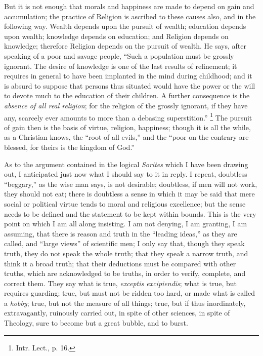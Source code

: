 But it is not enough that morals and happiness are made to depend
on gain and accumulation; the practice of Religion is ascribed to
these causes also, and in the following way. Wealth depends upon the
pursuit of wealth; education depends upon wealth; knowledge depends on
education; and Religion depends on knowledge; therefore Religion
depends on the pursuit of wealth. He says, after speaking of a poor
and savage people, ``Such a population must be grossly ignorant.
The desire of knowledge is one of the last results of refinement; it
requires in general to have been implanted in the mind during
childhood; and it is absurd to suppose that persons thus situated
would have the power or the will to devote much to the education of
their children. A further consequence is the \emph{absence of all real
religion}; for the religion of the grossly ignorant, if they have
any, scarcely ever amounts to more than a debasing superstition.''
\footnote{Intr. Lect., p.
16.} The pursuit of gain then is the basis of virtue, religion,
happiness; though it is all the while, as a Christian knows, the
``root of all evils,'' and the ``poor on the contrary are
blessed, for theirs is the kingdom of God.''

As to the argument contained in the logical \emph{Sorites} which I
have been drawing out, I anticipated just now what I should say to it
in reply. I repeat, doubtless ``beggary,'' as the wise man
says, is not desirable; doubtless, if men will not work, they should
not eat; there is doubtless a sense in which it may be said that mere
social or political virtue tends to moral and religious
excellence; but the sense needs to be defined and the statement to be
kept within bounds. This is the very point on which I am all along
insisting. I am not denying, I am granting, I am assuming, that there
is reason and truth in the ``leading ideas,'' as they are
called, and ``large views'' of scientific men; I only say
that, though they speak truth, they do not speak the whole truth; that
they speak a narrow truth, and think it a broad truth; that their
deductions must be compared with other truths, which are acknowledged
to be truths, in order to verify, complete, and correct them. They say
what is true, \emph{exceptis excipiendis}; what is true, but requires
guarding; true, but must not be ridden too hard, or made what is
called a \emph{hobby}; true, but not the measure of all things; true,
but if thus inordinately, extravagantly, ruinously carried out, in
spite of other sciences, in spite of Theology, sure to become but a
great bubble, and to burst.

